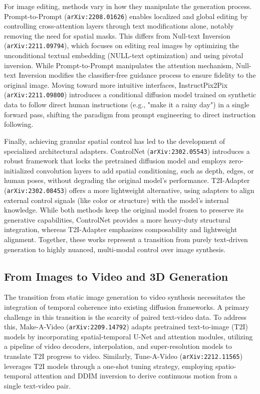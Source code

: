 \documentclass[11pt]{article}
\begin{document}
For image editing, methods vary in how they manipulate the generation process. Prompt-to-Prompt (\texttt{arXiv:2208.01626}) enables localized and global editing by controlling cross-attention layers through text modifications alone, notably removing the need for spatial masks. This differs from Null-text Inversion (\texttt{arXiv:2211.09794}), which focuses on editing real images by optimizing the unconditional textual embedding (NULL-text optimization) and using pivotal inversion. While Prompt-to-Prompt manipulates the attention mechanism, Null-text Inversion modifies the classifier-free guidance process to ensure fidelity to the original image. Moving toward more intuitive interfaces, InstructPix2Pix (\texttt{arXiv:2211.09800}) introduces a conditional diffusion model trained on synthetic data to follow direct human instructions (e.g., "make it a rainy day") in a single forward pass, shifting the paradigm from prompt engineering to direct instruction following.

Finally, achieving granular spatial control has led to the development of specialized architectural adapters. ControlNet (\texttt{arXiv:2302.05543}) introduces a robust framework that locks the pretrained diffusion model and employs zero-initialized convolution layers to add spatial conditioning, such as depth, edges, or human poses, without degrading the original model's performance. T2I-Adapter (\texttt{arXiv:2302.08453}) offers a more lightweight alternative, using adapters to align external control signals (like color or structure) with the model's internal knowledge. While both methods keep the original model frozen to preserve its generative capabilities, ControlNet provides a more heavy-duty structural integration, whereas T2I-Adapter emphasizes composability and lightweight alignment. Together, these works represent a transition from purely text-driven generation to highly nuanced, multi-modal control over image synthesis.

\subsection{From Images to Video and 3D Generation}

The transition from static image generation to video synthesis necessitates the integration of temporal coherence into existing diffusion frameworks. A primary challenge in this transition is the scarcity of paired text-video data. To address this, Make-A-Video (\texttt{arXiv:2209.14792}) adapts pretrained text-to-image (T2I) models by incorporating spatial-temporal U-Net and attention modules, utilizing a pipeline of video decoders, interpolation, and super-resolution models to translate T2I progress to video. Similarly, Tune-A-Video (\texttt{arXiv:2212.11565}) leverages T2I models through a one-shot tuning strategy, employing spatio-temporal attention and DDIM inversion to derive continuous motion from a single text-video pair.
\end{document}
